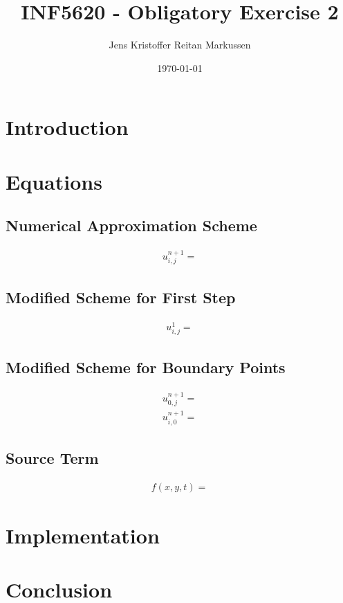 \documentclass[11pt]{article}
\title{INF5620 - Obligatory Exercise 2}
\author{Jens Kristoffer Reitan Markussen}
\date{\today}
\begin{document}
 	\maketitle 
	
	\section{Introduction}
	
	
	\section{Equations}
		\subsection{Numerical Approximation Scheme}
		\begin{align}
		u^{n+1}_{i, j} = 
		\end{align}
		\subsection{Modified Scheme for First Step}
		\begin{align}		
		u^{1}_{i, j} = 
		\end{align}		
		\subsection{Modified Scheme for Boundary Points}
		\begin{align}		
		u^{n+1}_{0, j} = 
		\end{align}
		\begin{align}		
		u^{n+1}_{i, 0} = 
		\end{align}		
		\subsection{Source Term}
		\begin{align}		
		f(x, y, t) =  
		\end{align}	
		
	\section{Implementation}
	
	\section{Conclusion}
\end{document}
